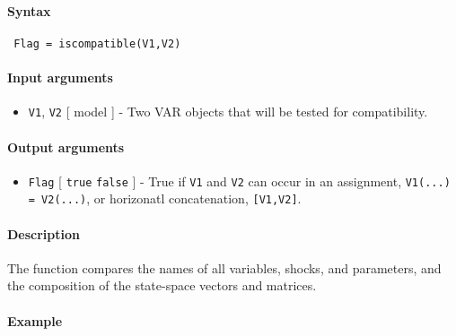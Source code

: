 


	\paragraph{Syntax}
 
 \begin{verbatim}
 Flag = iscompatible(V1,V2)
 \end{verbatim}
 
 \paragraph{Input arguments}
 
 \begin{itemize}
 \item
   \texttt{V1}, \texttt{V2} {[} model {]} - Two VAR objects that will be
   tested for compatibility.
 \end{itemize}
 
 \paragraph{Output arguments}
 
 \begin{itemize}
 \item
   \texttt{Flag} {[} \texttt{true} \textbar{} \texttt{false} {]} - True
   if \texttt{V1} and \texttt{V2} can occur in an assignment,
   \texttt{V1(...) = V2(...)}, or horizonatl concatenation,
   \texttt{{[}V1,V2{]}}.
 \end{itemize}
 
 \paragraph{Description}
 
 The function compares the names of all variables, shocks, and
 parameters, and the composition of the state-space vectors and matrices.
 
 \paragraph{Example}


